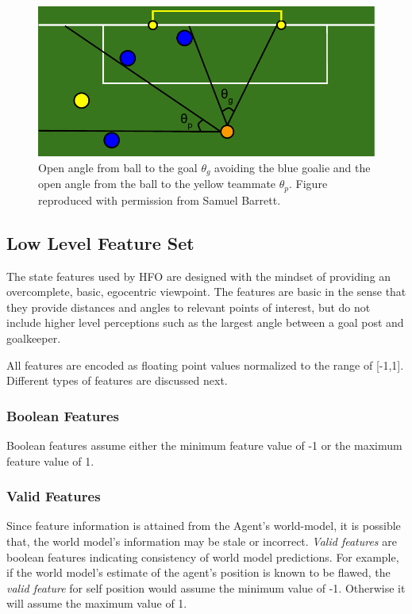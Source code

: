 \documentclass[12pt]{article}
\begin{document}
\begin{figure}[htp]
  \centering
  \includegraphics[width=.75\textwidth]{figures/openAngle}
  \caption{Open angle from ball to the goal $\theta_g$ avoiding the
    blue goalie and the open angle from the ball to the yellow
    teammate $\theta_p$. Figure reproduced with permission from Samuel
    Barrett.}
  \label{fig:openAngle}
\end{figure}

\subsection {Low Level Feature Set}
The state features used by HFO are designed with the mindset of
providing an overcomplete, basic, egocentric viewpoint. The features
are basic in the sense that they provide distances and angles to
relevant points of interest, but do not include higher level
perceptions such as the largest angle between a goal post and
goalkeeper.

All features are encoded as floating point values normalized to the
range of [-1,1]. Different types of features are discussed next.

\subsubsection{Boolean Features}

Boolean features assume either the minimum feature value of -1 or the
maximum feature value of 1.

\subsubsection{Valid Features}

Since feature information is attained from the Agent's world-model, it
is possible that, the world model's information may be stale or
incorrect. \textit{Valid features} are boolean features indicating
consistency of world model predictions. For example, if the world
model's estimate of the agent's position is known to be flawed, the
\textit{valid feature} for self position would assume the minimum
value of -1. Otherwise it will assume the maximum value of 1.
\end{document}
